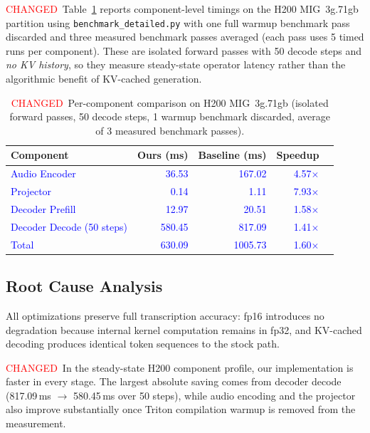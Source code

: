 \documentclass{article}
\newcommand{\chg}[1]{{\color{blue}#1}}
\newcommand{\chgcell}[1]{\textcolor{blue}{#1}}
\newcommand{\chglabel}{{\setlength{\fboxsep}{1pt}\colorbox{yellow!45}{\textcolor{red}{\scriptsize CHANGED}}}}
\begin{document}
\chglabel\ \chg{Table~\ref{tab:peroperator} reports component-level timings on the H200 MIG~3g.71gb partition using \texttt{benchmark\_detailed.py} with one full warmup benchmark pass discarded and three measured benchmark passes averaged (each pass uses 5 timed runs per component).  These are isolated forward passes with 50 decode steps and \emph{no KV history}, so they measure steady-state operator latency rather than the algorithmic benefit of KV-cached generation.}

\begin{table}[h]
\centering
\caption{\chglabel\ \chg{Per-component comparison on H200 MIG~3g.71gb (isolated forward passes, 50 decode steps, 1 warmup benchmark discarded, average of 3 measured benchmark passes).}}
\label{tab:peroperator}
\small
\begin{tabular}{@{}lrrrr@{}}
\toprule
\textbf{Component} & \textbf{Ours (ms)} & \textbf{Baseline (ms)} & \textbf{Speedup} \\
\midrule
\chgcell{Audio Encoder} & \chgcell{36.53} & \chgcell{167.02} & \chgcell{4.57$\times$} \\
\chgcell{Projector} & \chgcell{0.14} & \chgcell{1.11} & \chgcell{7.93$\times$} \\
\chgcell{Decoder Prefill} & \chgcell{12.97} & \chgcell{20.51} & \chgcell{1.58$\times$} \\
\chgcell{Decoder Decode (50 steps)} & \chgcell{580.45} & \chgcell{817.09} & \chgcell{1.41$\times$} \\
\midrule
\chgcell{Total} & \chgcell{630.09} & \chgcell{1005.73} & \chgcell{1.60$\times$} \\
\bottomrule
\end{tabular}
\end{table}

\subsection{Root Cause Analysis}

All optimizations preserve full transcription accuracy: fp16 introduces no degradation because internal kernel computation remains in fp32, and KV-cached decoding produces identical token sequences to the stock path.

\chglabel\ \chg{In the steady-state H200 component profile, our implementation is faster in every stage.  The largest absolute saving comes from decoder decode (817.09\,ms $\to$ 580.45\,ms over 50 steps), while audio encoding and the projector also improve substantially once Triton compilation warmup is removed from the measurement.}
\end{document}
